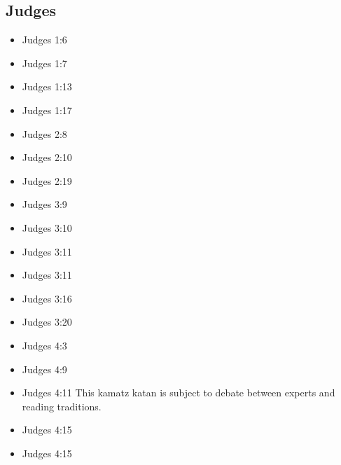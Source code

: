 \documentclass[14pt]{book}
\begin{document}
		\subsection{Judges}
		
		\begin{multicols}{2}\begin{itemize}
			
			\item Judges 1:6
			
			\item Judges 1:7
			
			\item Judges 1:13
			
			\item Judges 1:17
			
			\item Judges 2:8
			
			\item Judges 2:10
			
			\item Judges 2:19
			
			\item Judges 3:9
			
			\item Judges 3:10
			
			\item Judges 3:11
			
			\item Judges 3:11
			
			\item Judges 3:16
			
			\item Judges 3:20
			
			\item Judges 4:3
			
			\item Judges 4:9
			
			\item Judges 4:11 This kamatz katan is subject to debate between experts and reading traditions.
			
			\item Judges 4:15
			
			\item Judges 4:15
			

\end{itemize}
\end{multicols}
\end{document}

